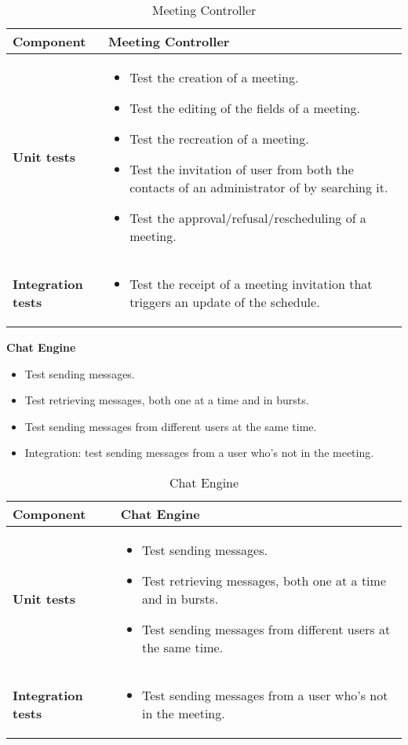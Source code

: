\begin{table}[H]	
	\centering
	\def\arraystretch{1.5}
	\begin{tabular}{|m{4cm}|m{12cm}|}
		\hline
		\textbf{Component} & Meeting Controller \\ \hline
		\textbf{Unit tests} & 
			\begin{itemize}
			\item Test the creation of a meeting.
			\item Test the editing of the fields of a meeting.
			\item Test the recreation of a meeting.
			\item Test the invitation of user from both the contacts of an administrator of by searching it.
			\item Test the approval/refusal/rescheduling of a meeting.
			\end{itemize} \\ \hline
		\textbf{Integration tests} & 
			\begin{itemize}
			\item Test the receipt of a meeting invitation that triggers an update of the schedule.
			\end{itemize} \\ \hline
	\end{tabular}
	\caption{Meeting Controller}
\end{table}

\textbf{Chat Engine}

\begin{itemize}
\item Test sending messages.
\item Test retrieving messages, both one at a time and in bursts.
\item Test sending messages from different users at the same time.
\item Integration: test sending messages from a user who's not in the meeting.
\end{itemize}

\begin{table}[H]	
	\centering
	\def\arraystretch{1.5}
	\begin{tabular}{|m{4cm}|m{12cm}|}
		\hline
		\textbf{Component} & Chat Engine \\ \hline
		\textbf{Unit tests} & 
			\begin{itemize}
			\item Test sending messages.
			\item Test retrieving messages, both one at a time and in bursts.
			\item Test sending messages from different users at the same time.
			\end{itemize} \\ \hline
		\textbf{Integration tests} & 
			\begin{itemize}
			\item Test sending messages from a user who's not in the meeting.
			\end{itemize} \\ \hline
	\end{tabular}
	\caption{Chat Engine}
\end{table}

